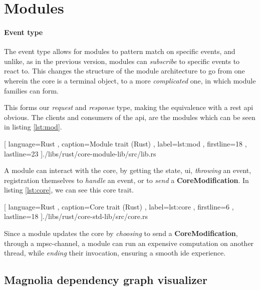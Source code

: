 \section{Modules} \label{sec:modules}

\paragraph{Event type} The event type allows for modules to pattern match on
specific events, and unlike, as in the previous version, modules can
\textit{subscribe} to specific events to react to. This changes the structure of
the module architecture to go from one wherein the core is a terminal object, to
a more \textit{complicated} one, in which module families can form.

This forms our \textit{request} and \textit{response} type, making the
equivalence with a \gls*{rest} \gls*{api} obvious. The clients and consumers
of the \gls*{api}, are the modules which can be seen in listing \ref{lst:mod}.

\begin{center}
  
    [ language=Rust
    , caption={Module trait (Rust)}
    , label=lst:mod
    , firstline=18
    , lastline=23
    ]{./libs/rust/core-module-lib/src/lib.rs}
\end{center}

A module can interact with the core, by getting the state, \gls*{ui},
\textit{throwing} an event, registration themselves to \textit{handle} an
event, or to \textit{send} a \textbf{CoreModification}. In listing
\ref{lst:core}, we can see this core trait.

\begin{code}[H]
  
    [ language=Rust
    , caption={Core trait (Rust)}
    , label=lst:core
    , firstline=6
    , lastline=18
    ]{./libs/rust/core-std-lib/src/core.rs}
\end{code}

Since a module updates the core by \textit{choosing} to send a
\textbf{CoreModification}, through a \gls*{mpsc}-channel, a module can run an
expensive computation on another thread, while \textit{ending} their
invocation, ensuring a smooth \gls*{ide} experience.


\subsection{Magnolia dependency graph visualizer}

